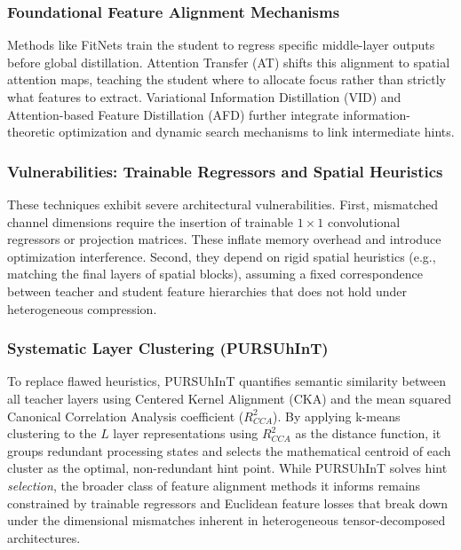 \documentclass[conference]{IEEEtran}
\begin{document}
\subsubsection{Foundational Feature Alignment Mechanisms}
\par
Methods like FitNets \cite{romero2015fitnetshintsdeepnets} train the student to regress specific middle-layer outputs before global distillation. Attention Transfer (AT) \cite{zagoruyko2016paying} shifts this alignment to spatial attention maps, teaching the student where to allocate focus rather than strictly what features to extract. Variational Information Distillation (VID) \cite{ahn2019variational} and Attention-based Feature Distillation (AFD) \cite{ji2021show} further integrate information-theoretic optimization and dynamic search mechanisms to link intermediate hints.


\subsubsection{Vulnerabilities: Trainable Regressors and Spatial Heuristics}
\par
These techniques exhibit severe architectural vulnerabilities. First, mismatched channel dimensions require the insertion of trainable $1\times1$ convolutional regressors or projection matrices. These inflate memory overhead and introduce optimization interference. Second, they depend on rigid spatial heuristics (e.g., matching the final layers of spatial blocks), assuming a fixed correspondence between teacher and student feature hierarchies that does not hold under heterogeneous compression.


\subsubsection{Systematic Layer Clustering (PURSUhInT)}
\par
To replace flawed heuristics, PURSUhInT \cite{keser2023pursuhint} quantifies semantic similarity between all teacher layers using Centered Kernel Alignment (CKA) \cite{kornblith2019similarity} and the mean squared Canonical Correlation Analysis coefficient ($R_{CCA}^2$). By applying k-means clustering to the $L$ layer representations using $R_{CCA}^2$ as the distance function, it groups redundant processing states and selects the mathematical centroid of each cluster as the optimal, non-redundant hint point. While PURSUhInT solves hint \emph{selection}, the broader class of feature alignment methods it informs remains constrained by trainable regressors and Euclidean feature losses that break down under the dimensional mismatches inherent in heterogeneous tensor-decomposed architectures.
\end{document}

